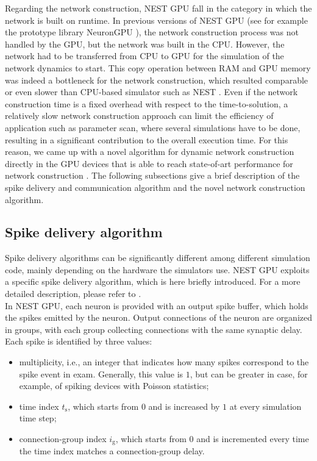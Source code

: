 \documentclass[a4paper, 12pt, twoside, openright]{book}
\begin{document}
Regarding the network construction, NEST GPU fall in the category in which the network is built on runtime. In previous versions of NEST GPU (see for example the prototype library NeuronGPU \cite{Golosio2021}), the network construction process was not handled by the GPU, but the network was built in the CPU. However, the network had to be transferred from CPU to GPU for the simulation of the network dynamics to start. This copy operation between RAM and GPU memory was indeed a bottleneck for the network construction, which resulted comparable or even slower than CPU-based simulator such as NEST \cite{Golosio2021, Tiddia2022}. Even if the network construction time is a fixed overhead with respect to the time-to-solution, a relatively slow network construction approach can limit the efficiency of application such as parameter scan, where several simulations have to be done, resulting in a significant contribution to the overall execution time. For this reason, we came up with a novel algorithm for dynamic network construction directly in the GPU devices that is able to reach state-of-art performance for network construction \cite{Golosio2023}. The following subsections give a brief description of the spike delivery and communication algorithm and the novel network construction algorithm.

\subsection{Spike delivery algorithm}
Spike delivery algorithms can be significantly different among different simulation code, mainly depending on the hardware the simulators use. NEST GPU exploits a specific spike delivery algorithm, which is here briefly introduced. For a more detailed description, please refer to \cite{Golosio2021, Tiddia2022}.\\
In NEST GPU, each neuron is provided with an output spike buffer, which holds the spikes emitted by the neuron. Output connections of the neuron are organized in groups, with each group collecting connections with the same synaptic delay. Each spike is identified by three values:
\begin{itemize}
    \item multiplicity, i.e., an integer that indicates how many spikes correspond to the spike event in exam. Generally, this value is $1$, but can be greater in case, for example, of spiking devices with Poisson statistics;
    \item time index $t_{\text{s}}$, which starts from $0$ and is increased by $1$ at every simulation time step;
    \item connection-group index $i_{\text{g}}$, which starts from $0$ and is incremented every time the time index matches a connection-group delay.
\end{itemize}
\end{document}
